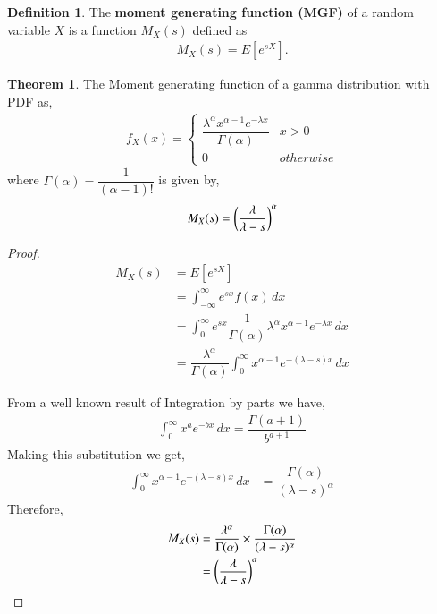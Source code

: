 \documentclass[journal,12pt,twocolumn]{IEEEtran}
\theoremstyle{definition}
\newtheorem{definition}{Definition}[section]
\newtheorem{theorem}{Theorem}[section]
\begin{document}
\begin{definition}
The \textbf{moment generating function (MGF)} of a random variable $X$ is a function $ M_X(s) $ defined as
\begin{align}
    M_X(s) = E[e^{sX}].
\end{align}
\end{definition}
\begin{theorem}
 The Moment generating function of a gamma distribution with PDF as,
 \begin{align}
f_{X}(x)  = 
\begin{cases}
\dfrac{\lambda^{\alpha}x^{\alpha-1}e^{-\lambda x}}{\Gamma(\alpha)} &  x > 0
\\
0 & otherwise
\end{cases}
\end{align}
where $ \Gamma(\alpha) = \dfrac{1}{(\alpha-1)!}$
is given by,
\begin{align}
    M_X(s) = \left(\dfrac{\lambda}{\lambda-s}\right)^{\alpha}
\end{align}
\end{theorem}
\begin{proof}
\begin{align}
    M_X(s) &= E[e^{sX}] \\
    &=  \int_{-\infty}^{\infty} e^{sx} f(x)\,dx \\
    &=    \int_{0}^{\infty} e^{sx} \dfrac{1}{\Gamma(\alpha)} \lambda^\alpha x^{\alpha-1}e^{-\lambda x}\,dx \\
    &= \dfrac{\lambda^\alpha}{\Gamma(\alpha)} \int_{0}^{\infty} x^{\alpha-1} e^{-(\lambda - s) x}\,dx 
\end{align}

From a well known result of Integration by parts we have,
\begin{align}
    \int_{0}^{\infty} x^a e^{-bx}\,dx = \dfrac{\Gamma(a+1)}{b^{a+1}}
    \label{eqidentity}
\end{align}
Making this substitution we get,
\begin{align}
  \int_{0}^{\infty} x^{\alpha-1} e^{-(\lambda - s) x}\,dx    &= \dfrac{\Gamma(\alpha)}{(\lambda - s)^\alpha}
\end{align}
Therefore,
\begin{align}
     M_X(s) &= \dfrac{\lambda^\alpha}{\Gamma(\alpha)} \times \dfrac{\Gamma(\alpha)}{(\lambda-s)^\alpha} \\
     &= \left(\dfrac{\lambda}{\lambda-s}\right)^\alpha
\end{align}
\end{proof}
\end{document}
